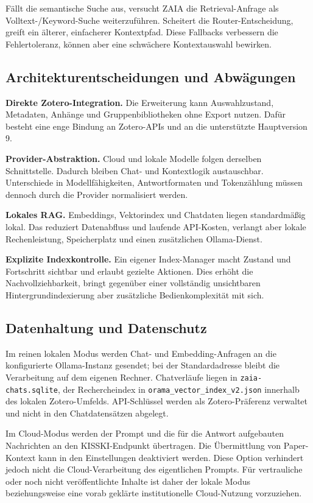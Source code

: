 \documentclass[11pt,a4paper,oneside,parskip=half]{scrartcl}
\begin{document}
Fällt die semantische Suche aus, versucht ZAIA die Retrieval-Anfrage als
Volltext-/Keyword-Suche weiterzuführen. Scheitert die Router-Entscheidung, greift
ein älterer, einfacherer Kontextpfad. Diese Fallbacks verbessern die
Fehlertoleranz, können aber eine schwächere Kontextauswahl bewirken.

\subsection{Architekturentscheidungen und Abwägungen}

\textbf{Direkte Zotero-Integration.} Die Erweiterung kann Auswahlzustand,
Metadaten, Anhänge und Gruppenbibliotheken ohne Export nutzen. Dafür besteht eine
enge Bindung an Zotero-APIs und an die unterstützte Hauptversion 9.

\textbf{Provider-Abstraktion.} Cloud und lokale Modelle folgen derselben
Schnittstelle. Dadurch bleiben Chat- und Kontextlogik austauschbar. Unterschiede
in Modellfähigkeiten, Antwortformaten und Tokenzählung müssen dennoch durch die
Provider normalisiert werden.

\textbf{Lokales RAG.} Embeddings, Vektorindex und Chatdaten liegen standardmäßig
lokal. Das reduziert Datenabfluss und laufende API-Kosten, verlangt aber lokale
Rechenleistung, Speicherplatz und einen zusätzlichen Ollama-Dienst.

\textbf{Explizite Indexkontrolle.} Ein eigener Index-Manager macht Zustand und
Fortschritt sichtbar und erlaubt gezielte Aktionen. Dies erhöht die
Nachvollziehbarkeit, bringt gegenüber einer vollständig unsichtbaren
Hintergrundindexierung aber zusätzliche Bedienkomplexität mit sich.

\subsection{Datenhaltung und Datenschutz}

Im reinen lokalen Modus werden Chat- und Embedding-Anfragen an die konfigurierte
Ollama-Instanz gesendet; bei der Standardadresse bleibt die Verarbeitung auf dem
eigenen Rechner. Chatverläufe liegen in \nolinkurl{zaia-chats.sqlite}, der
Rechercheindex in \nolinkurl{orama_vector_index_v2.json} innerhalb des lokalen
Zotero-Umfelds. API-Schlüssel werden als Zotero-Präferenz verwaltet und nicht in
den Chatdatensätzen abgelegt.

Im Cloud-Modus werden der Prompt und die für die Antwort aufgebauten Nachrichten
an den KISSKI-Endpunkt übertragen. Die Übermittlung von Paper-Kontext kann in den
Einstellungen deaktiviert werden. Diese Option verhindert jedoch nicht die
Cloud-Verarbeitung des eigentlichen Prompts. Für vertrauliche oder noch nicht
veröffentlichte Inhalte ist daher der lokale Modus beziehungsweise eine vorab
geklärte institutionelle Cloud-Nutzung vorzuziehen.
\end{document}

